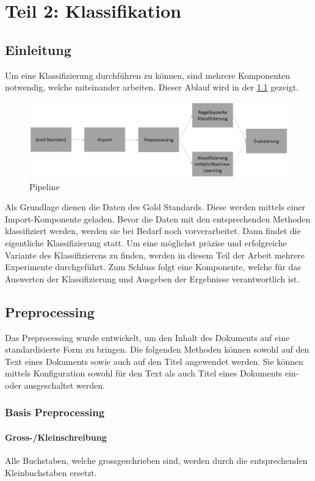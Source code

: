 \chapter{Teil 2: Klassifikation}
\section{Einleitung}\label{sec:classification}
Um eine Klassifizierung durchführen zu können, sind mehrere Komponenten notwendig, welche miteinander arbeiten. 
Dieser Ablauf wird in der \cref{fig:ablauf_klassifizierung} gezeigt.
\begin{figure}[H]	
	\includegraphics[width=1\columnwidth,keepaspectratio]{img/Ablauf_Klassifizierung.png}
	\caption{Pipeline}
	\label{fig:ablauf_klassifizierung}
\end{figure}
Als Grundlage dienen die Daten des Gold Standards.
Diese werden mittels einer Import-Komponente geladen.
Bevor die Daten mit den entsprechenden Methoden klassifiziert werden, werden sie bei Bedarf noch vorverarbeitet.
Dann findet die eigentliche Klassifizierung statt.
Um eine möglichst präzise und erfolgreiche Variante des Klassifizierens zu finden, werden in diesem Teil der Arbeit mehrere Experimente durchgeführt.
Zum Schluss folgt eine Komponente, welche für das Auswerten der Klassifizierung und Ausgeben der Ergebnisse verantwortlich ist.
\section{Preprocessing}
Das Preprocessing wurde entwickelt, um den Inhalt des Dokuments auf eine standardisierte Form zu bringen.
Die folgenden Methoden können sowohl auf den Text eines Dokuments sowie auch auf den Titel angewendet werden.
Sie können mittels Konfiguration sowohl für den Text als auch Titel eines Dokuments ein- oder ausgeschaltet werden.
\subsection{Basis Preprocessing}
\subsubsection{Gross-/Kleinschreibung}
Alle Buchstaben, welche grossgeschrieben sind, werden durch die entsprechenden Kleinbuchstaben ersetzt.

